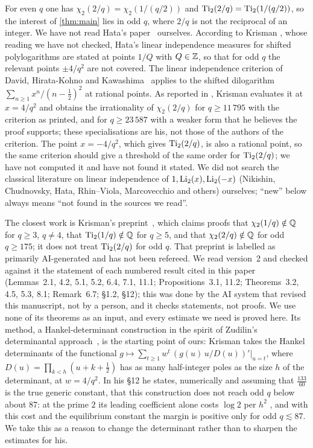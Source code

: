 For even $q$ one has $\chi_2(2/q)=\chi_2(1/(q/2))$ and $\operatorname{Ti}_2(2/q)=\operatorname{Ti}_2(1/(q/2))$, so the
interest of \cref{thm:main} lies in odd $q$, where $2/q$ is not the reciprocal of an integer.
We have not read Hata's paper~\cite{Hata1990} ourselves. According to Krisman
\cite[\S1.2]{Krisman2026chi2}, whose reading we have not checked, Hata's linear independence
measures for shifted polylogarithms are stated at points $1/Q$ with $Q\in\mathbb{Z}$, so that for odd $q$
the relevant points $\pm4/q^2$ are not covered. The linear independence criterion of David,
Hirata-Kohno and Kawashima~\cite{DHK2022Acta} applies to the shifted dilogarithm
$\sum_{n\ge1}x^n/(n-\frac12)^2$ at rational points. As reported in \cite[\S1.2]{Krisman2026chi2},
Krisman evaluates it at $x=4/q^2$ and obtains the irrationality of $\chi_2(2/q)$ for
$q\ge 11\,795$ with the criterion as printed, and for $q\ge23\,587$ with a weaker form that he
believes the proof supports; these specialisations are his, not those of the authors of the
criterion. The point $x=-4/q^2$, which gives $\operatorname{Ti}_2(2/q)$, is also a rational point, so the same
criterion should give a threshold of the same order for $\operatorname{Ti}_2(2/q)$; we have not computed it and
have not found it stated. We did not search the classical literature on linear independence of
$1,\operatorname{Li}_2(x),\operatorname{Li}_2(-x)$ (Nikishin, Chudnovsky, Hata, Rhin--Viola, Marcovecchio and others)
ourselves; ``new'' below always means ``not found in the sources we read''.

The closest work is Krisman's preprint~\cite{Krisman2026chi2}, which claims proofs that
$\chi_2(1/q)\notin\mathbb{Q}$ for $q\ge3$, $q\ne4$, that $\operatorname{Ti}_2(1/q)\notin\mathbb{Q}$ for $q\ge5$, and that
$\chi_2(2/q)\notin\mathbb{Q}$ for odd $q\ge175$; it does not treat $\operatorname{Ti}_2(2/q)$ for odd $q$. That
preprint is labelled as primarily AI-generated and has not been refereed. We read version~2 and
checked against it the statement of each numbered result cited in this paper (Lemmas~2.1, 4.2, 5.1, 5.2,
6.4, 7.1, 11.1; Propositions~3.1, 11.2; Theorems~3.2, 4.5, 5.3, 8.1; Remark~6.7; \S1.2, \S12);
this was done by the AI system that revised this manuscript, not by a person, and it checks
statements, not proofs. We use none of its theorems as an input, and every estimate we need is
proved here. Its method, a Hankel-determinant construction
in the spirit of Zudilin's determinantal approach~\cite{Zudilin2017}, is the starting point of
ours: Krisman takes the Hankel determinants of the functional
$g\mapsto\sum_{t\ge1}w^t\,(g(u)\,u/D(u))'|_{u=t}$, where $D(u)=\prod_{k<h}(u+k+\frac12)$ has as
many half-integer poles as the size $h$ of the determinant, at $w=4/q^2$. In his \S12 he
states, numerically and assuming that $\frac{133}{60}$ is the true generic constant, that this
construction does not reach odd $q$ below about $87$: at the prime $2$ its leading coefficient
alone costs $\log2$ per $h^2$ \cite[Prop.~11.2]{Krisman2026chi2}, and with this cost and the
equilibrium constant the margin is positive only for odd $q\lesssim87$. We take this as a
reason to change the determinant rather than to sharpen the estimates for his.

